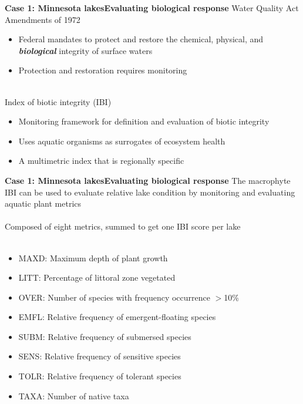 \documentclass[serif]{beamer}\usepackage[]{graphicx}\usepackage[]{color}
\newcommand{\emtxt}[1]{\textbf{\textit{#1}}}
\begin{document}
\begin{frame}{\textbf{Case 1: Minnesota lakes}}{\textbf{Evaluating biological response}}
\onslide<+->
Water Quality Act Amendments of 1972
\begin{itemize}
\item{Federal mandates to protect and restore the chemical, physical, and \emtxt{biological} integrity of surface waters}
\item{Protection and restoration requires monitoring \\~\\}
\end{itemize}
\onslide<+->
Index of biotic integrity (IBI) \cite{Karr81,Karr86}
\begin{itemize}
\item{Monitoring framework for definition and evaluation of biotic integrity}
\item{Uses aquatic organisms as surrogates of ecosystem health}
\item{A multimetric index that is regionally specific}
\end{itemize}
\end{frame}

\begin{frame}{\textbf{Case 1: Minnesota lakes}}{\textbf{Evaluating biological response}}
\onslide<+->
The macrophyte IBI can be used to evaluate relative lake condition by monitoring and evaluating aquatic plant metrics \cite{Beck10} \\~\\
\onslide<+->
Composed of eight metrics, summed to get one IBI score per lake \\~\\
\begin{itemize}
\item{MAXD: Maximum depth of plant growth}
\item{LITT: Percentage of littoral zone vegetated}
\item{OVER: Number of species with frequency occurrence $>$10\%}
\item{EMFL: Relative frequency of emergent-floating species}
\item{SUBM: Relative frequency of submersed species}
\item{SENS: Relative frequency of sensitive species}
\item{TOLR: Relative frequency of tolerant species}
\item{TAXA: Number of native taxa \\~\\}
\end{itemize}
\end{frame}
\end{document}
